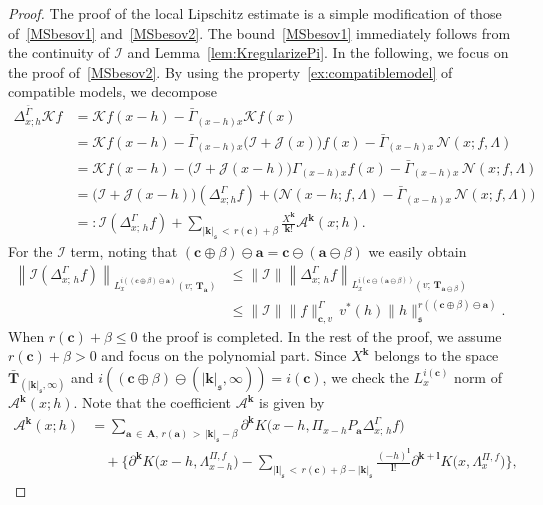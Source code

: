 \documentclass[10pt]{amsart}
\theoremstyle{definition}
\numberwithin{equation}{section}
\newcommand{\mfs}{\mathfrak{s}}
\newcommand{\bfa}{\mathbf{a}}
\newcommand{\bfc}{\mathbf{c}}
\newcommand{\bfcpb}{\mathbf{c}\oplus\beta}
\newcommand{\bfA}{\mathbf{A}}
\newcommand{\bfT}{\mathbf{T}}
\newcommand{\bfk}{\mathbf{k}}
\newcommand{\bfl}{\mathbf{l}}
\newcommand{\mcK}{\mathcal{K}}
\newcommand{\mcI}{\mathcal{I}}
\newcommand{\mcJ}{\mathcal{J}}
\newcommand{\mcN}{\mathcal{N}}
\newcommand{\mcA}{\mathcal{A}}
\begin{document}
\begin{proof}
The proof of the local Lipschitz estimate is a simple modification of those of~\eqref{MSbesov1} and~\eqref{MSbesov2}. The bound~\eqref{MSbesov1} immediately follows from the continuity of $\mcI$ and Lemma~\ref{lem:KregularizePi}. In the following, we focus on the proof of~\eqref{MSbesov2}. By using the property~\eqref{ex:compatiblemodel} of compatible models, we decompose
\begin{align*}
\Delta_{x;h}^{\bar\Gamma}\mcK f&=\mcK f(x-h)-\bar\Gamma_{(x-h)x}\mcK f(x)\\
&=\mcK f(x-h)-\bar\Gamma_{(x-h)x}\big(\mcI+\mcJ(x)\big)f(x)-\bar\Gamma_{(x-h)x}\,\mcN(x;f,\Lambda)\\
&=\mcK f(x-h)-\big(\mcI+\mcJ(x-h)\big)\Gamma_{(x-h)x}f(x)-\bar\Gamma_{(x-h)x}\,\mcN(x;f,\Lambda)\\
&=\big(\mcI+\mcJ(x-h)\big)(\Delta_{x;h}^\Gamma f) +\big(\mcN(x-h;f,\Lambda)-\bar\Gamma_{(x-h)x}\,\mcN(x;f,\Lambda)\big)\\
&=:\mcI\left(\Delta_{x;\,h}^\Gamma f\right)+\sum_{|{\bfk}|_{\mfs}\,<\,r(\bfc)+\beta}\frac{X^{\bfk}}{{\bfk}!}\mcA^{\bfk}(x;h).
\end{align*}
For the $\mcI$ term, noting that $(\bfcpb)\ominus\bfa=\bfc\ominus(\bfa\ominus\beta)$ we easily obtain
\begin{align*}
\left\|\mcI\left(\Delta_{x;\,h}^\Gamma f\right)\right\|_{L_x^{i((\bfcpb)\ominus\bfa)}(v;\,\bfT_\bfa)} &\le\|\mcI\|\left\|\Delta_{x;\,h}^\Gamma f\right\|_{L_x^{i(\bfc\ominus(\bfa\ominus\beta))}(v;\,\bfT_{\bfa\ominus\beta})}\\
&\le\|\mcI\|\|f\|_{\bfc,v}^\Gamma\, v^*(h)\|h\|_\mfs^{r((\bfcpb)\ominus\bfa)}.
\end{align*}
When $r(\bfc)+\beta\le0$ the proof is completed. In the rest of the proof, we assume $r(\bfc)+\beta>0$ and focus on the polynomial part. Since $X^{{\bfk}}$ belongs to the space $\bar{\bfT}_{(|{\bfk}|_{\mfs},\infty)}$ and $i((\bfc\oplus\beta)\ominus(|{\bfk}|_\mfs,\infty))=i(\bfc)$, we check the $L_x^{i(\bfc)}$ norm of $\mcA^{\bfk}(x;h)$. Note that the coefficient $\mcA^{\bfk}$ is given by
\begin{align*}
\mcA^{\bfk}(x;h)&=\sum_{\bfa\,\in\,\bfA,\,r(\bfa)\,>\,|{\bfk}|_{\mfs}-\beta}\partial^{\bfk}K\big(x-h,\Pi_{x-h} P_\bfa\Delta_{x;\,h}^\Gamma f\big)\\
&\quad+\bigg\{\partial^{\bfk}K\big(x-h, \Lambda_{x-h}^{\Pi,f}\big) -\sum_{|{\bfl}|_\mfs\,<\,r(\bfc)+\beta-|{\bfk}|_\mfs}\frac{(-h)^{\bfl}}{{\bfl}!}\partial^{{\bfk}+{\bfl}}K\big(x,\Lambda_x^{\Pi,f}\big)\bigg\},

\end{align*}
\end{proof}
\end{document}
